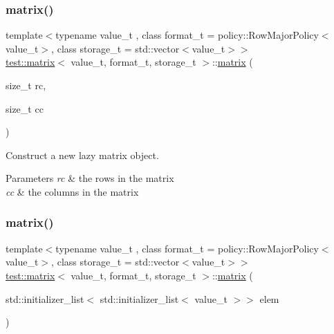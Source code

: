 \subsubsection{\texorpdfstring{matrix()}{matrix()}\hspace{0.1cm}{\footnotesize\ttfamily [1/5]}}
{\footnotesize\ttfamily template$<$typename value\+\_\+t , class format\+\_\+t  = policy\+::\+Row\+Major\+Policy$<$value\+\_\+t$>$, class storage\+\_\+t  = std\+::vector$<$value\+\_\+t$>$$>$ \\
\mbox{\hyperlink{classtest_1_1matrix}{test\+::matrix}}$<$ value\+\_\+t, format\+\_\+t, storage\+\_\+t $>$\+::\mbox{\hyperlink{classtest_1_1matrix}{matrix}} (\begin{DoxyParamCaption}\item[{size\+\_\+t}]{rc,  }\item[{size\+\_\+t}]{cc }\end{DoxyParamCaption})\hspace{0.3cm}{\ttfamily [inline]}}



Construct a new lazy matrix object. 


\begin{DoxyParams}{Parameters}
{\em rc} & the rows in the matrix \\
\hline
{\em cc} & the columns in the matrix \\
\hline
\end{DoxyParams}
\mbox{\label{classtest_1_1matrix_ad0412fdd504edcd16c8ad6a0e6a41789}} 
\subsubsection{\texorpdfstring{matrix()}{matrix()}\hspace{0.1cm}{\footnotesize\ttfamily [2/5]}}
{\footnotesize\ttfamily template$<$typename value\+\_\+t , class format\+\_\+t  = policy\+::\+Row\+Major\+Policy$<$value\+\_\+t$>$, class storage\+\_\+t  = std\+::vector$<$value\+\_\+t$>$$>$ \\
\mbox{\hyperlink{classtest_1_1matrix}{test\+::matrix}}$<$ value\+\_\+t, format\+\_\+t, storage\+\_\+t $>$\+::\mbox{\hyperlink{classtest_1_1matrix}{matrix}} (\begin{DoxyParamCaption}\item[{std\+::initializer\+\_\+list$<$ std\+::initializer\+\_\+list$<$ value\+\_\+t $>$$>$}]{elem }\end{DoxyParamCaption})\hspace{0.3cm}{\ttfamily [inline]}}



